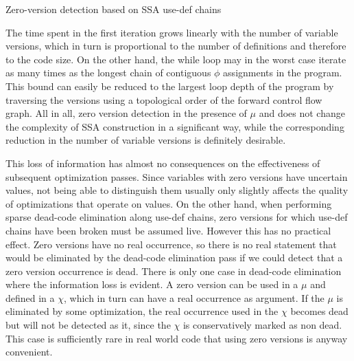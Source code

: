 \begin{algorithm}[htpb]
  \caption{\label{alg:hssa:zero-versioning}Zero-version detection based on SSA use-def chains}
\end{algorithm}

The time spent in the first iteration grows linearly with the number of variable versions, which in turn is proportional to the number of definitions and therefore to the code size.
On the other hand, the while loop may in the worst case iterate as many times as the longest chain of contiguous $\phi$ assignments in the program. This bound can easily be reduced to the largest loop depth of the program by traversing the versions using a topological order of the forward control flow graph.
All in all, zero version detection in the presence of $\mu$ and \chifuns does not change the complexity of SSA construction in a significant way, while the corresponding reduction in the number of variable versions is definitely desirable.

This loss of information has almost no consequences on the effectiveness of subsequent optimization passes.
Since variables with zero versions have uncertain values, not being able to distinguish them usually only slightly affects the quality of optimizations that operate on values.
On the other hand, when performing sparse dead-code elimination along use-def chains, zero versions for which use-def chains have been broken must be assumed live. However this has no practical effect. Zero versions have no real occurrence, so there is no real statement that would be eliminated by the dead-code elimination pass if we could detect that a zero version occurrence is dead.
There is only one case in dead-code elimination where the information loss is evident. A zero version can be used in a $\mu$ and defined in a $\chi$, which in turn can have a real occurrence as argument. If the $\mu$ is eliminated by some optimization, the real occurrence used in the $\chi$ becomes dead but will not be detected as it, since the $\chi$ is conservatively marked as non dead. This case is sufficiently rare in real world code that using zero versions is anyway convenient.


